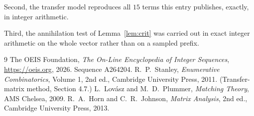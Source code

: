 \documentclass[11pt,a4paper]{article}
\theoremstyle{plain}
\theoremstyle{definition}
\begin{document}
Second, the transfer model reproduces all $15$ terms this entry publishes, exactly, in
integer arithmetic.

Third, the annihilation test of Lemma~\ref{lem:crit} was carried out in exact integer
arithmetic on the whole vector rather than on a sampled prefix.

\begin{thebibliography}{9}
 The OEIS Foundation, \emph{The On-Line Encyclopedia of Integer
Sequences}, \url{https://oeis.org}, 2026. Sequence A264204.
 R.~P.~Stanley, \emph{Enumerative Combinatorics}, Volume 1, 2nd ed.,
Cambridge University Press, 2011. (Transfer-matrix method, Section 4.7.)
 L.~Lov\'asz and M.~D.~Plummer, \emph{Matching Theory}, AMS Chelsea, 2009.
 R.~A.~Horn and C.~R.~Johnson, \emph{Matrix Analysis}, 2nd ed., Cambridge
University Press, 2013.
\end{thebibliography}
\end{document}
